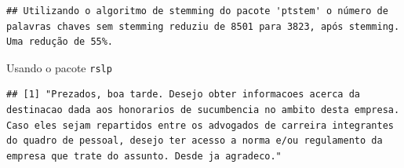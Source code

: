 \documentclass[]{article}
\newenvironment{Shaded}{\begin{snugshade}}{\end{snugshade}}
\newcommand{\KeywordTok}[1]{\textcolor[rgb]{0.13,0.29,0.53}{\textbf{#1}}}
\newcommand{\DecValTok}[1]{\textcolor[rgb]{0.00,0.00,0.81}{#1}}
\newcommand{\StringTok}[1]{\textcolor[rgb]{0.31,0.60,0.02}{#1}}
\newcommand{\OperatorTok}[1]{\textcolor[rgb]{0.81,0.36,0.00}{\textbf{#1}}}
\newcommand{\NormalTok}[1]{#1}
\begin{document}
\begin{Shaded}
\end{Shaded}

\begin{verbatim}
## Utilizando o algoritmo de stemming do pacote 'ptstem' o número de palavras chaves sem stemming reduziu de 8501 para 3823, após stemming. Uma redução de 55%.
\end{verbatim}

Usando o pacote \texttt{rslp}

\begin{Shaded}
\end{Shaded}

\begin{verbatim}
## [1] "Prezados, boa tarde. Desejo obter informacoes acerca da destinacao dada aos honorarios de sucumbencia no ambito desta empresa. Caso eles sejam repartidos entre os advogados de carreira integrantes do quadro de pessoal, desejo ter acesso a norma e/ou regulamento da empresa que trate do assunto. Desde ja agradeco."
\end{verbatim}

\begin{Shaded}
\end{Shaded}
\end{document}
